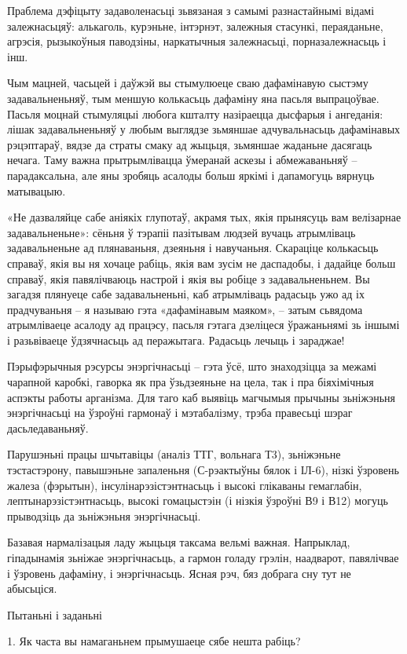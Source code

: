 Праблема дэфіцыту задаволенасьці зьвязаная з самымі разнастайнымі відамі залежнасьцяў: алькаголь, курэньне, інтэрнэт, залежныя стасункі, пераяданьне, агрэсія, рызыкоўныя паводзіны, наркатычныя залежнасьці, порназалежнасьць і інш.

Чым мацней, часьцей і даўжэй вы стымулюеце сваю дафамінавую сыстэму задавальненьняў, тым меншую колькасьць дафаміну яна пасьля выпрацоўвае. Пасьля моцнай стымуляцыі любога кшталту назіраецца дысфарыя і ангеданія: лішак задавальненьняў у любым выглядзе зьмяншае адчувальнасьць дафамінавых рэцэптараў, вядзе да страты смаку ад жыцьця, зьмяншае жаданьне дасягаць нечага. Таму важна прытрымлівацца ўмеранай аскезы і абмежаваньняў – парадаксальна, але яны зробяць асалоды больш яркімі і дапамогуць вярнуць матывацыю.

«Не дазваляйце сабе аніякіх глупотаў, акрамя тых, якія прынясуць вам велізарнае задавальненьне»: сёньня ў тэрапіі пазітывам людзей вучаць атрымліваць задавальненьне ад плянаваньня, дзеяньня і навучаньня. Скараціце колькасьць справаў, якія вы ня хочаце рабіць, якія вам зусім не даспадобы, і дадайце больш справаў, якія павялічваюць настрой і якія вы робіце з задавальненьнем. Вы загадзя плянуеце сабе задавальненьні, каб атрымліваць радасьць ужо ад іх прадчуваньня – я называю гэта «дафамінавым маяком», – затым сьвядома атрымліваеце асалоду ад працэсу, пасьля гэтага дзеліцеся ўражаньнямі зь іншымі і разьвіваеце ўдзячнасьць ад перажытага. Радасьць лечыць і зараджае!

Пэрыфэрычныя рэсурсы энэргічнасьці – гэта ўсё, што знаходзіцца за межамі чарапной каробкі, гаворка як пра ўзьдзеяньне на цела, так і пра біяхімічныя аспэкты работы арганізма. Для таго каб выявіць магчымыя прычыны зьніжэньня энэргічнасьці на ўзроўні гармонаў і мэтабалізму, трэба правесьці шэраг дасьледаваньняў.

Парушэньні працы шчытавіцы (аналіз ТТГ, вольнага Т3), зьніжэньне тэстастэрону, павышэньне запаленьня (С-рэактыўны бялок і ІЛ-6), нізкі ўзровень жалеза (фэрытын), інсулінарэзістэнтнасьць і высокі глікаваны гемаглабін, лептынарэзістэнтнасьць, высокі гомацыстэін (і нізкія ўзроўні В9 і В12) могуць прыводзіць да зьніжэньня энэргічнасьці.

Базавая нармалізацыя ладу жыцьця таксама вельмі важная. Напрыклад, гіпадынамія зьніжае энэргічнасьць, а гармон голаду грэлін, наадварот, павялічвае і ўзровень дафаміну, і энэргічнасьць. Ясная рэч, бяз добрага сну тут не абысьціся.

Пытаньні і заданьні

1. Як часта вы намаганьнем прымушаеце сябе нешта рабіць?

